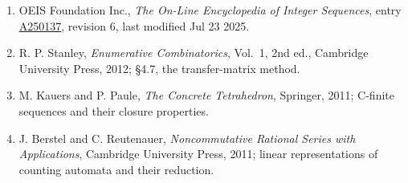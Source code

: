 \documentclass[11pt]{article}
\theoremstyle{definition}
\begin{document}
\begin{enumerate}

\item OEIS Foundation Inc., \emph{The On-Line Encyclopedia of Integer Sequences}, entry \href{https://oeis.org/A250137}{A250137}, revision 6, last modified Jul 23 2025.

\item R. P. Stanley, \emph{Enumerative Combinatorics}, Vol.~1, 2nd ed., Cambridge University Press, 2012; \S4.7, the transfer-matrix method.

\item M. Kauers and P. Paule, \emph{The Concrete Tetrahedron}, Springer, 2011; C-finite sequences and their closure properties.

\item J. Berstel and C. Reutenauer, \emph{Noncommutative Rational Series with Applications}, Cambridge University Press, 2011; linear representations of counting automata and their reduction.

\end{enumerate}
\end{document}
